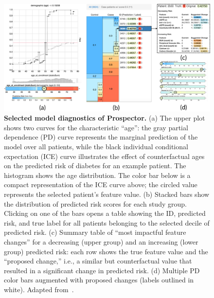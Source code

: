\documentclass[
  oneside]{book}
\begin{document}
\begin{figure}[htbp]

{\centering \includegraphics[width=1\linewidth]{figures/03-prospector} 

}

\caption{\textbf{Selected model diagnostics of Prospector.} (a) The upper plot shows two curves for the characteristic ``age'': the gray partial dependence (PD) curve represents the marginal prediction of the model over all patients, while the black individual conditional expectation (ICE) curve illustrates the effect of counterfactual ages on the predicted risk of diabetes for an example patient. The histogram shows the age distribution. The color bar below is a compact representation of the ICE curve above; the circled value represents the selected patient's feature value. (b) Stacked bars show the distribution of predicted risk scores for each study group. Clicking on one of the bars opens a table showing the ID, predicted risk, and true label for all patients belonging to the selected decile of predicted risk. (c) Summary table of ``most impactful feature changes'' for a decreasing (upper group) and an increasing (lower group) predicted risk: each row shows the true feature value and the ``proposed change,'' i.e., a similar but counterfactual value that resulted in a significant change in predicted risk. (d) Multiple PD color bars augmented with proposed changes (labels outlined in white). Adapted from~\autocite{Krause:Prospector2016}.}\label{fig:03-prospector}
\end{figure}
\end{document}
